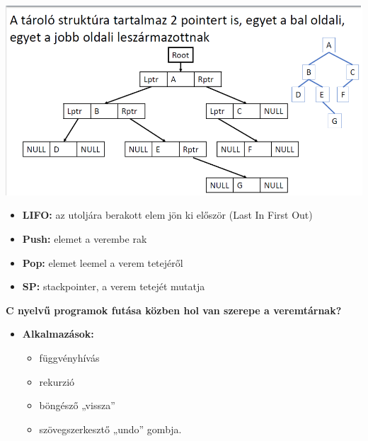 \documentclass[11pt,a4paper]{article}
\begin{document}
\begin{tcolorbox}[colback=blue!5!white,colframe=blue!50!black,title= 22. Ismertesse a bináris fák szerkezetét és tárolási lehetőségeit számítógépen!]
\begin{center}
                \end{center}
                \begin{center}
                    \includegraphics[scale = 0.3]{23_4.png}
                \end{center}
            \end{tcolorbox}
            
            \begin{tcolorbox}[colback=blue!5!white,colframe=blue!50!black,title= 23. Ismertesse a veremtár működését!]
                \begin{itemize}
                    \item \textbf{LIFO:} az utoljára berakott elem jön ki először (Last In First Out)
                    \item \textbf{Push:} elemet a verembe rak
                    \item \textbf{Pop:} elemet leemel a verem tetejéről
                    \item \textbf{SP:} stackpointer, a verem tetejét mutatja
                \end{itemize}
                \textbf{C nyelvű programok futása közben hol van szerepe a veremtárnak?}
                \begin{itemize}
                    \item \textbf{Alkalmazások:}
                    \begin{itemize}
                        \item függvényhívás
                        \item rekurzió
                        \item böngésző „vissza”
                        \item szövegszerkesztő „undo” gombja.
                    \end{itemize}
                \end{itemize}
            \end{tcolorbox}
            
\end{document}
